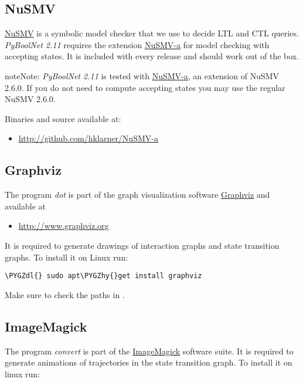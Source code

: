 \documentclass[letterpaper,10pt,english]{sphinxmanual}
\def\PYGZdl{\char`\$}
\def\PYGZhy{\char`\-}
\begin{document}
\subsection{NuSMV}
\label{Installation:nusmv}\label{Installation:installation-nusmv}
\href{http://nusmv.fbk.eu}{NuSMV} is a symbolic model checker that we use to decide LTL and CTL queries.
\emph{PyBoolNet 2.11} requires the extension \href{https://github.com/hklarner/NuSMV-a}{NuSMV-a} for model checking with accepting states.
It is included with every release and should work out of the box.

\begin{notice}{note}{Note:}
\emph{PyBoolNet 2.11} is tested with \href{https://github.com/hklarner/NuSMV-a}{NuSMV-a}, an extension of NuSMV 2.6.0. If you do not need to compute accepting states you may use the regular NuSMV 2.6.0.
\end{notice}

Binaries and source available at:
\begin{itemize}
\item {} 
\href{http://github.com/hklarner/NuSMV-a}{http://github.com/hklarner/NuSMV-a}

\end{itemize}


\subsection{Graphviz}
\label{Installation:graphviz}\label{Installation:installation-graphviz}
The program \emph{dot} is part of the graph visualization software \href{http://www.graphviz.org/}{Graphviz} and available at
\begin{itemize}
\item {} 
\href{http://www.graphviz.org}{http://www.graphviz.org}

\end{itemize}

It is required to generate drawings of interaction graphs and state transition graphs.
To install it on Linux run:

\begin{Verbatim}[commandchars=\\\{\}]
\PYGZdl{} sudo apt\PYGZhy{}get install graphviz
\end{Verbatim}

Make sure to check the paths in .


\subsection{ImageMagick}
\label{Installation:imagemagick}\label{Installation:installation-imagemagick}
The program \emph{convert} is part of the \href{http://www.imagemagick.org/script/index.php}{ImageMagick} software suite.
It is required to generate animations of trajectories in the state transition graph.
To install it on linux run:
\end{document}
